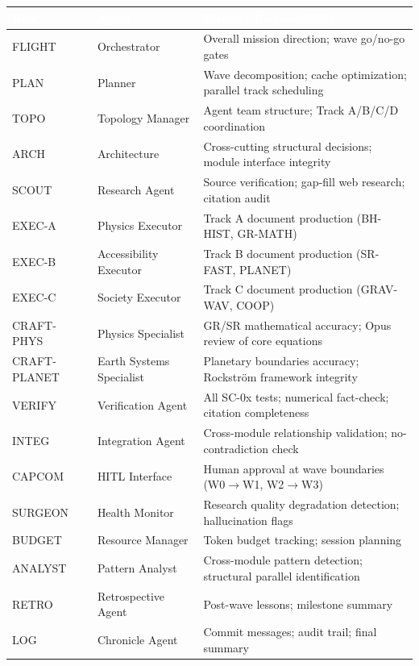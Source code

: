 \documentclass[11pt,letterpaper]{article}
\newcommand{\tableheader}[1]{\textbf{\sffamily\textcolor{white}{#1}}}
\begin{document}
\begin{center}
\begin{tabularx}{\textwidth}{L{2cm}L{3cm}X}
\toprule
{}
\tableheader{Role} & \tableheader{Agent} & \tableheader{Primary Responsibility} \\
\midrule
FLIGHT & Orchestrator & Overall mission direction; wave go/no-go gates \\
PLAN & Planner & Wave decomposition; cache optimization; parallel track scheduling \\
TOPO & Topology Manager & Agent team structure; Track A/B/C/D coordination \\
ARCH & Architecture & Cross-cutting structural decisions; module interface integrity \\
SCOUT & Research Agent & Source verification; gap-fill web research; citation audit \\
EXEC-A & Physics Executor & Track A document production (BH-HIST, GR-MATH) \\
EXEC-B & Accessibility Executor & Track B document production (SR-FAST, PLANET) \\
EXEC-C & Society Executor & Track C document production (GRAV-WAV, COOP) \\
CRAFT-PHYS & Physics Specialist & GR/SR mathematical accuracy; Opus review of core equations \\
CRAFT-PLANET & Earth Systems Specialist & Planetary boundaries accuracy; Rockstr{\"o}m framework integrity \\
VERIFY & Verification Agent & All SC-0x tests; numerical fact-check; citation completeness \\
INTEG & Integration Agent & Cross-module relationship validation; no-contradiction check \\
CAPCOM & HITL Interface & Human approval at wave boundaries (W0$\to$W1, W2$\to$W3) \\
SURGEON & Health Monitor & Research quality degradation detection; hallucination flags \\
BUDGET & Resource Manager & Token budget tracking; session planning \\
ANALYST & Pattern Analyst & Cross-module pattern detection; structural parallel identification \\
RETRO & Retrospective Agent & Post-wave lessons; milestone summary \\
LOG & Chronicle Agent & Commit messages; audit trail; final summary \\
\bottomrule
\end{tabularx}
\end{center}
\end{document}
